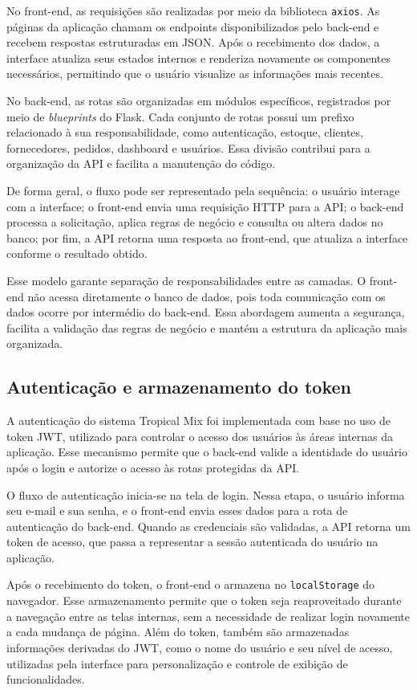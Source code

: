 No front-end, as requisições são realizadas por meio da biblioteca \texttt{axios}. As páginas da aplicação chamam os endpoints disponibilizados pelo back-end e recebem respostas estruturadas em JSON. Após o recebimento dos dados, a interface atualiza seus estados internos e renderiza novamente os componentes necessários, permitindo que o usuário visualize as informações mais recentes.

No back-end, as rotas são organizadas em módulos específicos, registrados por meio de \textit{blueprints} do Flask. Cada conjunto de rotas possui um prefixo relacionado à sua responsabilidade, como autenticação, estoque, clientes, fornecedores, pedidos, dashboard e usuários. Essa divisão contribui para a organização da API e facilita a manutenção do código.

De forma geral, o fluxo pode ser representado pela sequência: o usuário interage com a interface; o front-end envia uma requisição HTTP para a API; o back-end processa a solicitação, aplica regras de negócio e consulta ou altera dados no banco; por fim, a API retorna uma resposta ao front-end, que atualiza a interface conforme o resultado obtido.

Esse modelo garante separação de responsabilidades entre as camadas. O front-end não acessa diretamente o banco de dados, pois toda comunicação com os dados ocorre por intermédio do back-end. Essa abordagem aumenta a segurança, facilita a validação das regras de negócio e mantém a estrutura da aplicação mais organizada.

\subsection{Autenticação e armazenamento do token}

A autenticação do sistema Tropical Mix foi implementada com base no uso de token JWT, utilizado para controlar o acesso dos usuários às áreas internas da aplicação. Esse mecanismo permite que o back-end valide a identidade do usuário após o login e autorize o acesso às rotas protegidas da API.

O fluxo de autenticação inicia-se na tela de login. Nessa etapa, o usuário informa seu e-mail e sua senha, e o front-end envia esses dados para a rota de autenticação do back-end. Quando as credenciais são validadas, a API retorna um token de acesso, que passa a representar a sessão autenticada do usuário na aplicação.

Após o recebimento do token, o front-end o armazena no \texttt{localStorage} do navegador. Esse armazenamento permite que o token seja reaproveitado durante a navegação entre as telas internas, sem a necessidade de realizar login novamente a cada mudança de página. Além do token, também são armazenadas informações derivadas do JWT, como o nome do usuário e seu nível de acesso, utilizadas pela interface para personalização e controle de exibição de funcionalidades.

